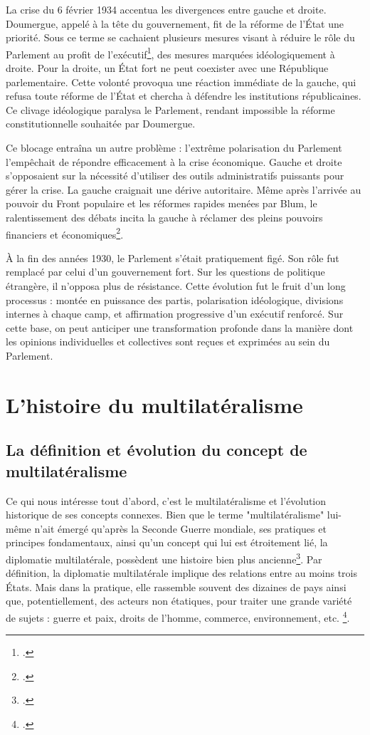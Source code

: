 \documentclass[a4paper,twoside,12pt]{book}
\begin{document}
La crise du 6 février 1934 accentua les divergences entre gauche et droite. Doumergue, appelé à la tête du gouvernement, fit de la réforme de l'État une priorité. Sous ce terme se cachaient plusieurs mesures visant à réduire le rôle du Parlement au profit de l'exécutif\footcite[p.357]{zotero-515}, des mesures marquées idéologiquement à droite. Pour la droite, un État fort ne peut coexister avec une République parlementaire. Cette volonté provoqua une réaction immédiate de la gauche, qui refusa toute réforme de l'État et chercha à défendre les institutions républicaines. Ce clivage idéologique paralysa le Parlement, rendant impossible la réforme constitutionnelle souhaitée par Doumergue.

Ce blocage entraîna un autre problème : l'extrême polarisation du Parlement l'empêchait de répondre efficacement à la crise économique. Gauche et droite s'opposaient sur la nécessité d'utiliser des outils administratifs puissants pour gérer la crise. La gauche craignait une dérive autoritaire. Même après l'arrivée au pouvoir du Front populaire et les réformes rapides menées par Blum, le ralentissement des débats incita la gauche à réclamer des pleins pouvoirs financiers et économiques\footcite[p.364]{zotero-515}.

À la fin des années 1930, le Parlement s'était pratiquement figé. Son rôle fut remplacé par celui d'un gouvernement fort. Sur les questions de politique étrangère, il n'opposa plus de résistance. Cette évolution fut le fruit d'un long processus : montée en puissance des partis, polarisation idéologique, divisions internes à chaque camp, et affirmation progressive d'un exécutif renforcé. Sur cette base, on peut anticiper une transformation profonde dans la manière dont les opinions individuelles et collectives sont reçues et exprimées au sein du Parlement.


\section{L'histoire du multilatéralisme}
\subsection{La définition et évolution du concept de multilatéralisme}
Ce qui nous intéresse tout d'abord, c'est le multilatéralisme et l'évolution historique de ses concepts connexes.
Bien que le terme "multilatéralisme" lui-même n'ait émergé qu'après la Seconde Guerre mondiale, ses pratiques et principes fondamentaux, ainsi qu'un concept qui lui est étroitement lié, la diplomatie multilatérale, possèdent une histoire bien plus ancienne\footcite{library}. Par définition, la diplomatie multilatérale implique des relations entre au moins trois États. Mais dans la pratique, elle rassemble souvent des dizaines de pays ainsi que, potentiellement, des acteurs non étatiques, pour traiter une grande variété de sujets : guerre et paix, droits de l'homme, commerce, environnement, etc. \footcite[p.35]{petiteville2020}.
\end{document}
